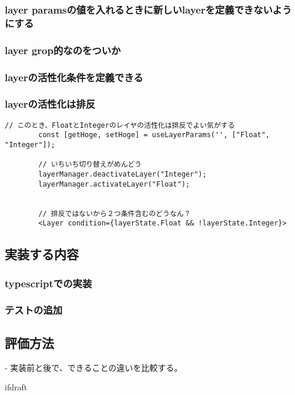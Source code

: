 \documentclass{jsarticle}
\begin{document}
    \subsubsection{layer paramsの値を入れるときに新しいlayerを定義できないようにする}

    \subsubsection{layer grop的なのをついか}

    \subsubsection{layerの活性化条件を定義できる}

    \subsubsection{layerの活性化は排反}
        \begin{lstlisting}[caption=hoge,label=fuga]
        // このとき、FloatとIntegerのレイヤの活性化は排反でよい気がする
        const [getHoge, setHoge] = useLayerParams('', ["Float", "Integer"]);

        // いちいち切り替えがめんどう
        layerManager.deactivateLayer("Integer");
        layerManager.activateLayer("Float");


        // 排反ではないから２つ条件含むのどうなん？
        <Layer condition={layerState.Float && !layerState.Integer}>
        \end{lstlisting}

    \subsection{実装する内容}

    \subsubsection{typescriptでの実装}

    \subsubsection{テストの追加}


    \subsection{評価方法}
    - 実装前と後で、できることの違いを比較する。
















    \expandafter\ifx\csname ifdraft\endcsname\relax
\end{document}
